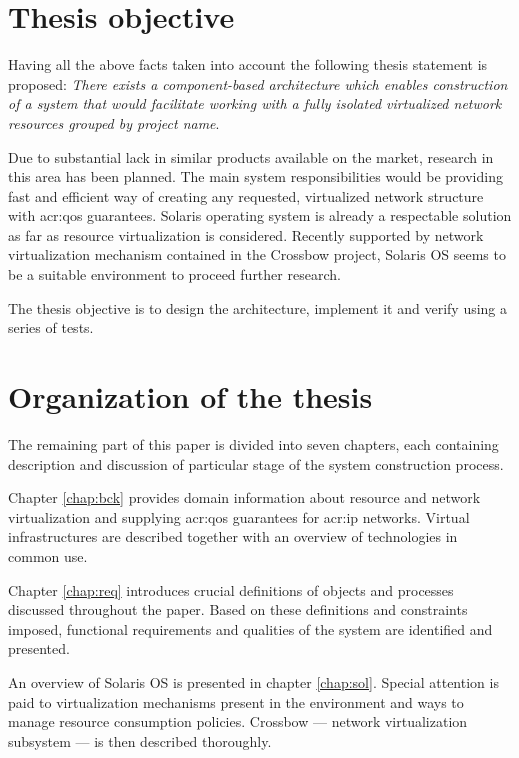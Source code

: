 \documentclass[11pt,openany]{book}
\begin{document}
    \section{Thesis objective}

      Having all the above facts taken into account the following thesis statement is proposed: \textit{There exists a
      component-based architecture which enables construction of a system that would facilitate working with a fully
      isolated virtualized network resources grouped by project name}.

      Due to substantial lack in similar products available on the market, research in this area has been planned. The
      main system responsibilities would be providing fast and efficient way of creating any requested, virtualized
      network structure with \gls{acr:qos} guarantees. Solaris operating system is already a respectable solution as far
      as resource virtualization is considered. Recently supported by network virtualization mechanism contained in the
      Crossbow project, Solaris OS seems to be a suitable environment to proceed further research.

      The thesis objective is to design the architecture, implement it and verify using a series of tests.


    \section{Organization of the thesis}

      The remaining part of this paper is divided into seven chapters, each containing description and discussion of
      particular stage of the system construction process.

      Chapter \ref{chap:bck} provides domain information about resource and network virtualization and supplying
      \gls{acr:qos} guarantees for \gls{acr:ip} networks. Virtual infrastructures are described together with an
      overview of technologies in common use.

      Chapter \ref{chap:req} introduces crucial definitions of objects and processes discussed throughout the paper.
      Based on these definitions and constraints imposed, functional requirements and qualities of the system are
      identified and presented.

      An overview of Solaris OS is presented in chapter \ref{chap:sol}. Special attention is paid to virtualization
      mechanisms present in the environment and ways to manage resource consumption policies. Crossbow --- network
      virtualization subsystem --- is then described thoroughly.
\end{document}
